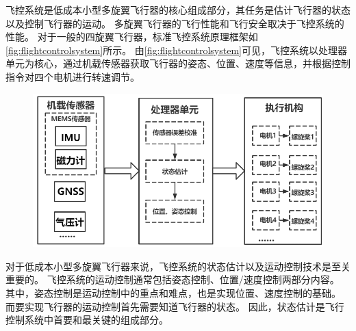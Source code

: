 \documentclass[
  type=master
]{gdutthesis}
\begin{document}
飞控系统是低成本小型多旋翼飞行器的核心组成部分，其任务是估计飞行器的状态以及控制飞行器的运动。
多旋翼飞行器的飞行性能和飞行安全取决于飞控系统的性能。
对于一般的四旋翼飞行器，标准飞控系统原理框架如\autoref{fig:flightcontrolsystem}所示。
由\autoref{fig:flightcontrolsystem}可见，飞控系统以处理器单元为核心，通过机载传感器获取飞行器的姿态、位置、速度等信息，并根据控制指令对四个电机进行转速调节。
\begin{figure}[H]
	\centering
	\includegraphics[width=1.0\textwidth]{微信图片_20220504193723.png}
	\label{fig:flightcontrolsystem}
\end{figure}

对于低成本小型多旋翼飞行器来说，飞控系统的状态估计以及运动控制技术是至关重要的。
飞控系统的运动控制通常包括姿态控制、位置/速度控制两部分内容。
其中，姿态控制是运动控制中的重点和难点，也是实现位置、速度控制的基础。
而要实现飞行器的运动控制首先需要知道飞行器的状态。
因此，状态估计是飞行控制系统中首要和最关键的组成部分。

%
%
\end{document}
